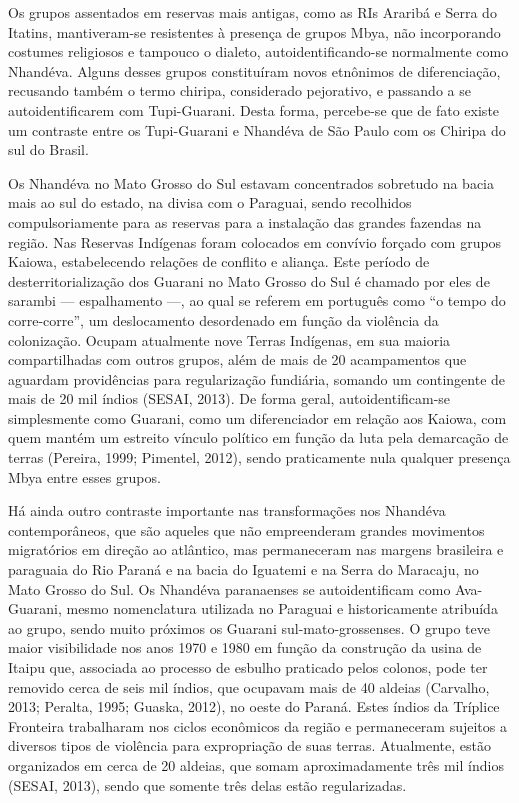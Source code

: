 Os grupos assentados em reservas mais antigas, como as RIs Araribá e
Serra do Itatins, mantiveram-se resistentes à presença de grupos Mbya,
não incorporando costumes religiosos e tampouco o dialeto,
autoidentificando-se normalmente como Nhandéva. Alguns desses grupos
constituíram novos etnônimos de diferenciação, recusando também o termo
chiripa, considerado pejorativo, e passando a se autoidentificarem com
Tupi-Guarani. Desta forma, percebe-se que de fato existe um contraste
entre os Tupi-Guarani e Nhandéva de São Paulo com os Chiripa do sul do
Brasil.

Os Nhandéva no Mato Grosso do Sul estavam concentrados sobretudo na
bacia mais ao sul do estado, na divisa com o Paraguai, sendo recolhidos
compulsoriamente para as reservas para a instalação das grandes
fazendas na região. Nas Reservas Indígenas foram colocados em convívio
forçado com grupos Kaiowa, estabelecendo relações de conflito e
aliança.  Este período de desterritorialização dos Guarani no Mato
Grosso do Sul é chamado por eles de sarambi — espalhamento —, ao qual
se referem em português como ``o tempo do corre-corre'', um deslocamento
desordenado em função da violência da colonização. Ocupam atualmente
nove Terras Indígenas, em sua maioria compartilhadas com outros grupos,
além de mais de 20 acampamentos que aguardam providências para
regularização fundiária, somando um contingente de mais de 20 mil
índios (SESAI, 2013). De forma geral, autoidentificam-se simplesmente
como Guarani, como um diferenciador em relação aos Kaiowa, com quem
mantém um estreito vínculo político em função da luta pela demarcação
de terras (Pereira, 1999; Pimentel, 2012), sendo praticamente nula
qualquer presença Mbya entre esses grupos.

Há ainda outro contraste importante nas transformações nos Nhandéva
contemporâneos, que são aqueles que não empreenderam grandes movimentos
migratórios em direção ao atlântico, mas permaneceram nas margens
brasileira e paraguaia do Rio Paraná e na bacia do Iguatemi e na Serra
do Maracaju, no Mato Grosso do Sul. Os Nhandéva paranaenses se
autoidentificam como Ava-Guarani, mesmo nomenclatura utilizada no
Paraguai e historicamente atribuída ao grupo, sendo muito próximos os
Guarani sul-mato-grossenses. O grupo teve maior visibilidade nos anos
1970 e 1980 em função da construção da usina de Itaipu que, associada
ao processo de esbulho praticado pelos colonos, pode ter removido cerca
de seis mil índios, que ocupavam mais de 40 aldeias (Carvalho, 2013;
Peralta, 1995; Guaska, 2012), no oeste do Paraná. Estes índios da
Tríplice Fronteira trabalharam nos ciclos econômicos da região e
permaneceram sujeitos a diversos tipos de violência para expropriação
de suas terras. Atualmente, estão organizados em cerca de 20 aldeias,
que somam aproximadamente três mil índios (SESAI, 2013), sendo que
somente três delas estão regularizadas.

